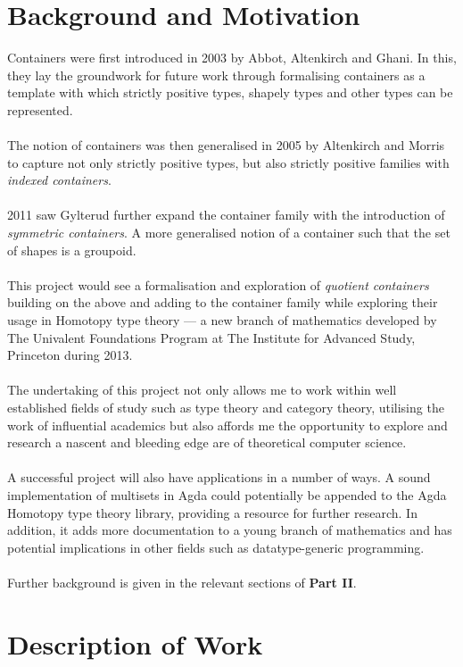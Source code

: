 \documentclass[12pt]{report}
\begin{document}
\section{Background and Motivation}
Containers were first introduced in 2003 by Abbot, Altenkirch and Ghani\cite{coc}. In this, they lay the groundwork for future work through formalising containers as a template with which strictly positive types, shapely types and other types can be represented.\\
\\
The notion of containers was then generalised in 2005 by Altenkirch and Morris\cite{icont} to capture not only strictly positive types, but also strictly positive families with \textit{indexed containers}.\\
\\
2011 saw Gylterud\cite{hott3} further expand the container family with the introduction of \textit{symmetric containers}. A more generalised notion of a container such that the set of shapes is a groupoid.\\
\\
This project would see a formalisation and exploration of \textit{quotient containers} building on the above and adding to the container family while exploring their usage in Homotopy type theory --- a new branch of mathematics developed by The Univalent Foundations Program at The Institute for Advanced Study, Princeton during 2013.\\
\\
The undertaking of this project not only allows me to work within well established fields of study such as type theory and category theory, utilising the work of influential academics but also affords me the opportunity to explore and research a nascent and bleeding edge are of theoretical computer science.\\
\\
A successful project will also have applications in a number of ways. A sound implementation of multisets in Agda could potentially be appended to the Agda Homotopy type theory library, providing a resource for further research. In addition, it adds more documentation to a young branch of mathematics and has potential implications in other fields such as datatype-generic programming.\\
\\
Further background is given in the relevant sections of \textbf{Part II}.


\section{Description of Work}
\end{document}
